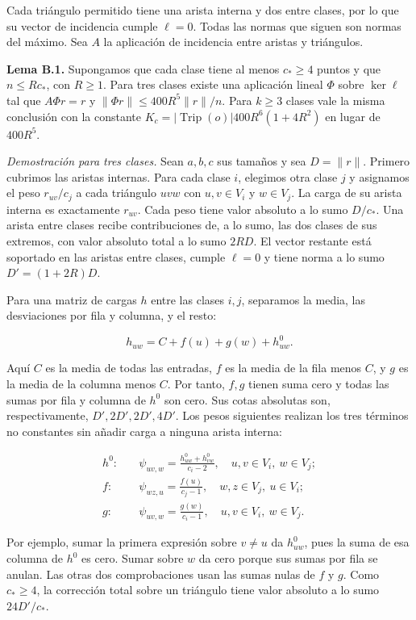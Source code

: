 \documentclass[spanish,11pt,a4paper]{article}
\begin{document}
Cada triángulo permitido tiene una arista interna y dos entre clases, por lo que su vector de incidencia cumple \(\ell=0\). Todas las normas que siguen son normas del máximo. Sea \(A\) la aplicación de incidencia entre aristas y triángulos.

\textbf{Lema B.1.} Supongamos que cada clase tiene al menos \(c_\ast\ge4\) puntos y que \(n\le R c_\ast\), con \(R\ge1\). Para tres clases existe una aplicación lineal \(\Phi\) sobre \(\ker\ell\) tal que \(A\Phi r=r\) y \(\|\Phi r\|\le400R^5\|r\|/n\). Para \(k\ge3\) clases vale la misma conclusión con la constante \(K_c=|\operatorname{Trip}(o)|400R^6(1+4R^2)\) en lugar de \(400R^5\).

\emph{Demostración para tres clases.} Sean \(a,b,c\) sus tamaños y sea \(D=\|r\|\). Primero cubrimos las aristas internas. Para cada clase \(i\), elegimos otra clase \(j\) y asignamos el peso \(r_{uv}/c_j\) a cada triángulo \(uvw\) con \(u,v\in V_i\) y \(w\in V_j\). La carga de su arista interna es exactamente \(r_{uv}\). Cada peso tiene valor absoluto a lo sumo \(D/c_\ast\). Una arista entre clases recibe contribuciones de, a lo sumo, las dos clases de sus extremos, con valor absoluto total a lo sumo \(2RD\). El vector restante está soportado en las aristas entre clases, cumple \(\ell=0\) y tiene norma a lo sumo \(D'=(1+2R)D\).

Para una matriz de cargas \(h\) entre las clases \(i,j\), separamos la media, las desviaciones por fila y columna, y el resto:

\[h_{uw}=C+f(u)+g(w)+h^0_{uw}.\]

Aquí \(C\) es la media de todas las entradas, \(f\) es la media de la fila menos \(C\), y \(g\) es la media de la columna menos \(C\). Por tanto, \(f,g\) tienen suma cero y todas las sumas por fila y columna de \(h^0\) son cero. Sus cotas absolutas son, respectivamente, \(D',2D',2D',4D'\). Los pesos siguientes realizan los tres términos no constantes sin añadir carga a ninguna arista interna:

\[\begin{aligned}
 h^0:&\quad \psi_{uv,w}=\frac{h^0_{uw}+h^0_{vw}}{c_i-2},\quad u,v\in V_i,\ w\in V_j;\\
 f:&\quad \psi_{wz,u}=\frac{f(u)}{c_j-1},\quad w,z\in V_j,\ u\in V_i;\\
 g:&\quad \psi_{uv,w}=\frac{g(w)}{c_i-1},\quad u,v\in V_i,\ w\in V_j.
\end{aligned}
\tag{B.1}\]

Por ejemplo, sumar la primera expresión sobre \(v\ne u\) da \(h^0_{uw}\), pues la suma de esa columna de \(h^0\) es cero. Sumar sobre \(w\) da cero porque sus sumas por fila se anulan. Las otras dos comprobaciones usan las sumas nulas de \(f\) y \(g\). Como \(c_\ast\ge4\), la corrección total sobre un triángulo tiene valor absoluto a lo sumo \(24D'/c_\ast\).
\end{document}

